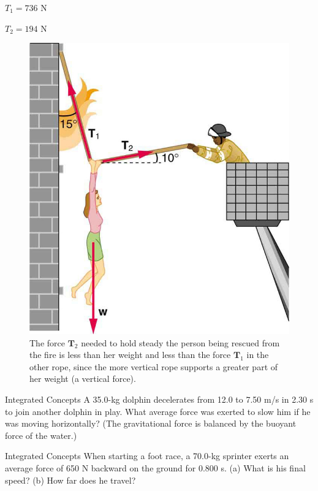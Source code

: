 \documentclass[
]{book}
\begin{document}
\(T_{1} = \text{736\ N}\)

\({T_{2} = \text{194\ N}}{}\)

\begin{figure}
\hypertarget{import-auto-id2677556}{%
\centering
\includegraphics{images/Figure 04_07_08.jpg}
\caption{The force \(\textbf{T}_{2}{}\) needed to hold steady the person being
rescued from the fire is less than her weight and less than the force
\(\textbf{T}_{1}{}\)\textbf{} in the other rope,
since the more vertical rope supports a greater part of her weight (a
vertical force).}\label{import-auto-id2677556}
}
\end{figure}

\hypertarget{fs-id1486506}{}
\hypertarget{fs-id3036356}{}
{Integrated Concepts} A 35.0-kg dolphin decelerates
from 12.0 to 7.50 m/s in 2.30 s to join another dolphin in play. What
average force was exerted to slow him if he was moving horizontally?
(The gravitational force is balanced by the buoyant force of the water.)

\hypertarget{fs-id3078491}{}
\hypertarget{fs-id1614205}{}
{Integrated Concepts} When starting a foot race, a
70.0-kg sprinter exerts an average force of 650 N backward on the ground
for 0.800 s. (a) What is his final speed? (b) How far does he travel?
\end{document}
